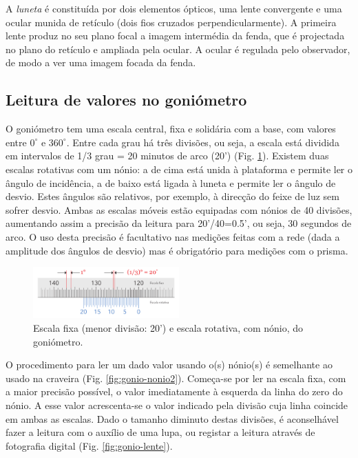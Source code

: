 \documentclass[a4paper,twoside,11pt]{report}      %
\begin{document}
A \emph{luneta} é constituída por dois elementos ópticos, uma lente convergente e uma ocular munida de retículo (dois fios cruzados perpendicularmente). A primeira lente produz no seu plano focal a imagem intermédia da fenda, que é projectada no plano do retículo e ampliada pela ocular. A ocular é regulada pelo observador, de modo a ver uma imagem focada da fenda.

\subsection{\sf Leitura de valores no goniómetro}
O goniómetro tem uma escala central, fixa e solidária com a base, com valores entre $0^\circ$ e $360^\circ$. Entre cada grau há três divisões, ou seja, a escala está dividida em intervalos de 1/3 grau = 20 minutos de arco (20') (Fig. \ref{fig:gonio-nonio1}). Existem duas escalas rotativas com um nónio: a de cima está unida à plataforma e permite ler o ângulo de incidência, a de baixo está ligada à luneta e permite ler o ângulo de desvio. Estes ângulos são relativos, por exemplo, à direcção do feixe de luz sem sofrer desvio. Ambas as escalas móveis estão equipadas com nónios de 40 divisões, aumentando assim a precisão da leitura para 20'/40=0.5', ou seja, 30 segundos de arco. O uso desta precisão é facultativo nas medições feitas com a rede (dada a amplitude dos ângulos de desvio) mas é obrigatório para medições com o prisma.

\begin{figure}
	\centering 
	\includegraphics[width=0.5\textwidth]{gonio-nonio1}
	\caption{Escala fixa (menor divisão: 20') e escala rotativa, com nónio, do goniómetro.
	\label{fig:gonio-nonio1}} 
\end{figure}

O procedimento para ler um dado valor usando o(s) nónio(s) é semelhante ao usado na craveira (Fig. \ref{fig:gonio-nonio2}). Começa-se por ler na escala fixa, com a maior precisão possível, o valor imediatamente à esquerda da linha do zero do nónio. A esse valor acrescenta-se o valor indicado pela divisão cuja linha coincide em ambas as escalas. Dado o tamanho diminuto destas divisões, é aconselhável fazer a leitura com o auxílio de uma lupa, ou registar a leitura através de fotografia digital (Fig. \ref{fig:gonio-lente}).
\end{document}
